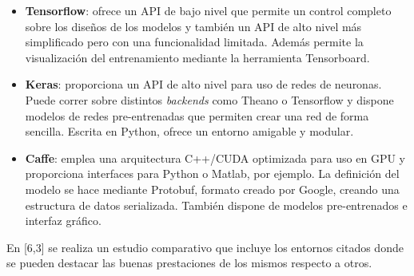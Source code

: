\documentclass{bmvc2k}
\begin{document}
\begin{itemize}
\item \textbf{Tensorflow}: ofrece un API de bajo nivel que permite un control completo sobre los diseños de los modelos y también un API de alto nivel más simplificado pero con una funcionalidad limitada. Además permite la visualización del entrenamiento mediante la herramienta Tensorboard.
\item \textbf{Keras}: proporciona un API de alto nivel para uso de redes de neuronas. Puede correr sobre distintos \textit{backends} como Theano o Tensorflow y dispone modelos de redes pre-entrenadas que permiten crear una red de forma sencilla. Escrita en Python, ofrece un entorno amigable y modular.
\item \textbf{Caffe}: emplea una arquitectura C++/CUDA optimizada para uso en GPU y proporciona interfaces para Python o Matlab, por ejemplo. La definición del modelo se hace mediante Protobuf, formato creado por Google, creando una estructura de datos serializada. También dispone de modelos pre-entrenados e interfaz gráfico.
\end{itemize}
En [6,3] se realiza un estudio comparativo que incluye los entornos citados donde se pueden destacar las buenas prestaciones de los mismos respecto a otros.\\
\end{document}
